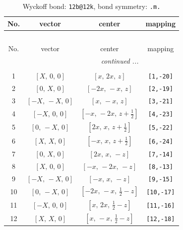 \documentclass[fleqn,8pt]{jsarticle}
\begin{document}
\renewcommand{\arraystretch}{1.2}
\begin{longtable}{cccc}
\caption{Wyckoff bond: {\tt 12b@12k}, bond symmetry: {\tt .m.}}
 \\
 \hline \hline
No. & vector & center & mapping \\ \hline \endfirsthead

\multicolumn{3}{l}{\tablename\ \thetable{}} \\
 \hline \hline
No. & vector & center & mapping \\ \hline \endhead

 \hline \hline
\multicolumn{3}{r}{\footnotesize\it continued ...} \\ \endfoot

 \hline \hline
\multicolumn{3}{r}{} \\ \endlastfoot

1 & $\left[ X,\, 0,\, 0 \right]$ & $\left[ x,\, 2 x,\, z \right]$ & {\tt [1,-20]} \\ \hline
2 & $\left[ 0,\, X,\, 0 \right]$ & $\left[ - 2 x,\, - x,\, z \right]$ & {\tt [2,-19]} \\ \hline
3 & $\left[ - X,\, - X,\, 0 \right]$ & $\left[ x,\, - x,\, z \right]$ & {\tt [3,-21]} \\ \hline
4 & $\left[ - X,\, 0,\, 0 \right]$ & $\left[ - x,\, - 2 x,\, z + \frac{1}{2} \right]$ & {\tt [4,-23]} \\ \hline
5 & $\left[ 0,\, - X,\, 0 \right]$ & $\left[ 2 x,\, x,\, z + \frac{1}{2} \right]$ & {\tt [5,-22]} \\ \hline
6 & $\left[ X,\, X,\, 0 \right]$ & $\left[ - x,\, x,\, z + \frac{1}{2} \right]$ & {\tt [6,-24]} \\ \hline
7 & $\left[ 0,\, X,\, 0 \right]$ & $\left[ 2 x,\, x,\, - z \right]$ & {\tt [7,-14]} \\ \hline
8 & $\left[ X,\, 0,\, 0 \right]$ & $\left[ - x,\, - 2 x,\, - z \right]$ & {\tt [8,-13]} \\ \hline
9 & $\left[ - X,\, - X,\, 0 \right]$ & $\left[ - x,\, x,\, - z \right]$ & {\tt [9,-15]} \\ \hline
10 & $\left[ 0,\, - X,\, 0 \right]$ & $\left[ - 2 x,\, - x,\, \frac{1}{2} - z \right]$ & {\tt [10,-17]} \\ \hline
11 & $\left[ - X,\, 0,\, 0 \right]$ & $\left[ x,\, 2 x,\, \frac{1}{2} - z \right]$ & {\tt [11,-16]} \\ \hline
12 & $\left[ X,\, X,\, 0 \right]$ & $\left[ x,\, - x,\, \frac{1}{2} - z \right]$ & {\tt [12,-18]} \\
\end{longtable}
\end{document}
